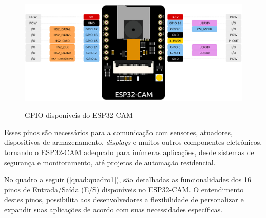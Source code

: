 \begin{figure}[h!]
    \centering
    \caption{GPIO disponíveis do ESP32-CAM}
    \includegraphics[scale=0.28]{figuras/esp32pin.jpg}
    \label{fig:esp32pin}
    \centering
\end{figure}

Esses pinos são necessários para a comunicação com sensores, atuadores,
dispositivos de armazenamento, \textit{displays} e muitos outros componentes
eletrônicos, tornando o ESP32-CAM
adequado para inúmeras aplicações, desde sistemas de
segurança e monitoramento, até projetos de automação residencial.

No quadro a seguir (\autoref{quad:quadro1}), são detalhadas as funcionalidades dos 16 pinos 
de Entrada/Saída (E/S) disponíveis no ESP32-CAM. O entendimento destes pinos, possibilita 
aos desenvolvedores a flexibilidade de personalizar e expandir suas 
aplicações de acordo com suas necessidades específicas.

